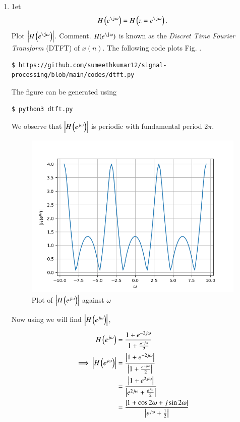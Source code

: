 \documentclass[journal,12pt,twocolumn]{IEEEtran}
\renewcommand\thesection{\arabic{section}}
\begin{document}
\begin{enumerate}[label=\thesection.\arabic*]
\item
1et
\begin{equation}
H\brak{e^{\j \omega}} = H\brak{z = e^{\j \omega}}.
\end{equation}
Plot $\abs{H\brak{e^{\j \omega}}}$.  Comment.  $H(e^{\j \omega})$ is
known as the {\em Discret Time Fourier Transform} (DTFT) of $x(n)$.
\solution The following code plots Fig. .
\begin{lstlisting}
$ https://github.com/sumeethkumar12/signal-processing/blob/main/codes/dtft.py
\end{lstlisting}
The figure can be generated using
\begin{lstlisting}
$ python3 dtft.py
\end{lstlisting}
We observe that $\left|H\left(e^{j\omega}\right)\right|$ is periodic with fundamental period 2$\pi$.
\begin{figure}[!ht]
	\centering
	\includegraphics[width=\columnwidth]{dtft.png}
	\caption{Plot of $\left|H\left(e^{j\omega}\right)\right|$ against $\omega$}
	\label{fig:H-w}
\end{figure}
Now using  we will find $\left\vert H\left(e^{j \omega}\right)\right\vert$,
     \begin{align}
      H\brak{e^{j \omega}} &= \frac{1+e^{-2j\omega}}{1 + \frac{e^{-j\omega}}{2}}\\
        \implies \abs{H\brak{e^{j \omega}}} &= \frac{\abs{1+e^{-2j\omega}}}{\abs{1 + \frac{e^{-j\omega}}{2}}}\\
                            &= \frac{\abs{1+e^{2j\omega}}}{\abs{e^{2j\omega} + \frac{e^{j\omega}}{2}}}\\
                            &= \frac{\abs{1+\cos2\omega + j\sin2\omega}}{\abs{e^{j\omega}+ \frac{1}{2}}}\\

\end{align}
\end{enumerate}
\end{document}
